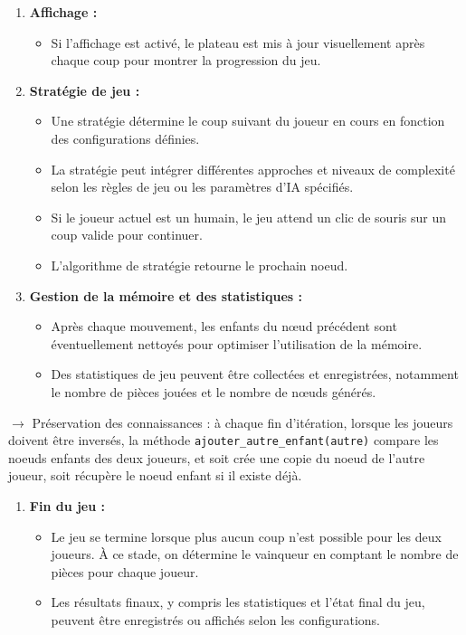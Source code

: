 \begin{enumerate}[resume]
    \item \textbf{Affichage :}
    \begin{itemize}
        \item Si l'affichage est activé, le plateau est mis à jour visuellement après chaque coup pour montrer la progression du jeu.
    \end{itemize}
    
    \item \textbf{Stratégie de jeu :}
    \begin{itemize}
        \item Une stratégie détermine le coup suivant du joueur en cours en fonction des configurations définies.
        \item La stratégie peut intégrer différentes approches et niveaux de complexité selon les règles de jeu ou les paramètres d'IA spécifiés.
        \item Si le joueur actuel est un humain, le jeu attend un clic de souris sur un coup valide pour continuer.
        \item L'algorithme de stratégie retourne le prochain noeud.
    \end{itemize}

    \item \textbf{Gestion de la mémoire et des statistiques :}
    \begin{itemize}
        \item Après chaque mouvement, les enfants du nœud précédent sont éventuellement nettoyés pour optimiser l'utilisation de la mémoire.
        \item Des statistiques de jeu peuvent être collectées et enregistrées, notamment le nombre de pièces jouées et le nombre de nœuds générés.
    \end{itemize}
\end{enumerate}
$\rightarrow$ Préservation des connaissances : à chaque fin d'itération, lorsque les joueurs doivent être inversés, la méthode \texttt{ajouter\_autre\_enfant(autre)} compare les noeuds enfants des deux joueurs, et soit crée une copie du noeud de l'autre joueur, soit récupère le noeud enfant si il existe déjà.
\begin{enumerate}[resume]
    \item \textbf{Fin du jeu :}
    \begin{itemize}
        \item Le jeu se termine lorsque plus aucun coup n'est possible pour les deux joueurs. À ce stade, on détermine le vainqueur en comptant le nombre de pièces pour chaque joueur.
        \item Les résultats finaux, y compris les statistiques et l'état final du jeu, peuvent être enregistrés ou affichés selon les configurations.
    \end{itemize}
\end{enumerate}

